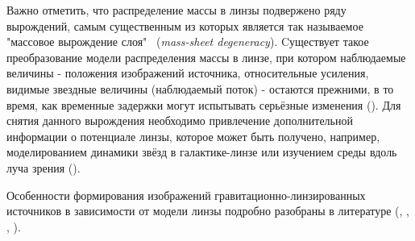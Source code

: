 Важно отметить, что распределение массы в линзы подвержено ряду вырождений, самым существенным из которых является так называемое "массовое вырождение слоя" \ (\textit{mass-sheet degeneracy}). Cуществует такое преобразование модели распределения массы в линзе, при котором наблюдаемые величины - положения изображений источника, относительные усиления, видимые звездные величины (наблюдаемый поток) - остаются прежними, в то время, как временные задержки могут испытывать серьёзные изменения (\cite{falco1985}). Для снятия данного вырождения необходимо привлечение дополнительной информации о потенциале линзы, которое может быть получено, например, моделированием динамики звёзд в галактике-линзе или изучением среды вдоль луча зрения (\cite{suyu2010}).

Особенности формирования изображений гравитационно-линзированных источников в зависимости от модели линзы подробно разобраны в литературе (\cite{blandfordnarayan1986}, \cite{kayserrefsdal1983}, \cite{narbart}, \cite{shwamb2002}).